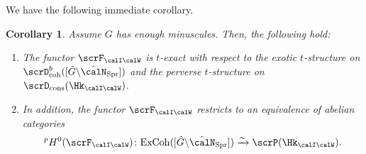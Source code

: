 \documentclass[10pt, reqno]{amsart}
\theoremstyle{plain}
\newtheorem{corollary}[theorem]{Corollary}
\theoremstyle{definition}
\numberwithin{equation}{section}
\begin{document}
We have the following immediate corollary.
\begin{corollary}\label{coro_F_IW_is_t_exact}Assume $G$ has enough minuscules. Then, the following hold:
	\begin{enumerate}
		\item The functor $\scrF_{\calI\calW}$ is $t$-exact with respect to the exotic $t$-structure on $\scrD_\mathrm{coh}^b([\hat{G}\backslash \hat{\calN}_\mathrm{Spr}])$ and the perverse $t$-structure on $\scrD_{\mathrm{cons}}(\Hk_{\calI\calW})$.  
		\item In addition, the functor $\scrF_{\calI\calW}$ restricts to an equivalence of abelian categories
		\begin{equation}
			^pH^0(\scrF_{\calI\calW})\colon\mathrm{ExCoh}([\hat{G}\backslash\hat{\calN}_{\mathrm{Spr}}])\xrightarrow{\sim} \scrP(\Hk_{\calI\calW}).
		\end{equation}
	\end{enumerate}
\end{corollary}
\end{document}
